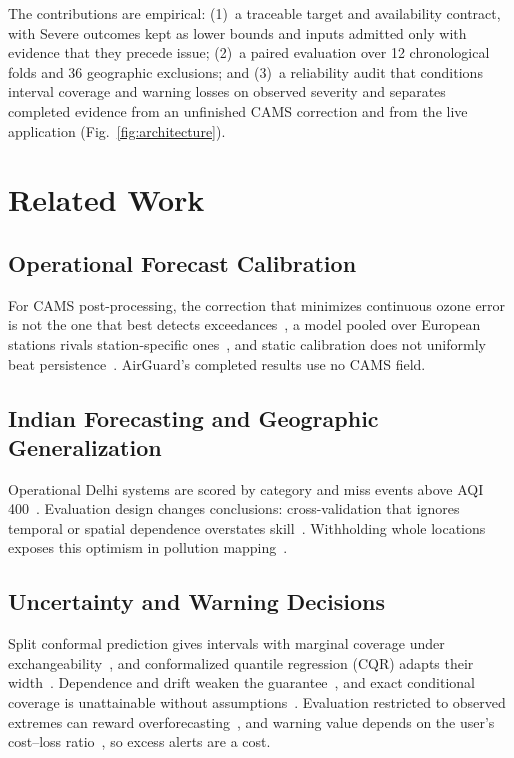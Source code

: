 \documentclass[conference,a4paper]{IEEEtran}
\begin{document}
The contributions are empirical: (1)~a traceable target and availability contract, with Severe outcomes kept as lower bounds and inputs admitted only with evidence that they precede issue; (2)~a paired evaluation over 12 chronological folds and 36 geographic exclusions; and (3)~a reliability audit that conditions interval coverage and warning losses on observed severity and separates completed evidence from an unfinished CAMS correction and from the live application (Fig.~\ref{fig:architecture}).

\section{Related Work}
\subsection{Operational Forecast Calibration}
For CAMS post-processing, the correction that minimizes continuous ozone error is not the one that best detects exceedances~\cite{petetin2022}, a model pooled over European stations rivals station-specific ones~\cite{bertrand2023}, and static calibration does not uniformly beat persistence~\cite{casciaro2022}. AirGuard's completed results use no CAMS field.

\subsection{Indian Forecasting and Geographic Generalization}
Operational Delhi systems are scored by category and miss events above AQI 400~\cite{jena2021,govardhan2024}. Evaluation design changes conclusions: cross-validation that ignores temporal or spatial dependence overstates skill~\cite{roberts2017}. Withholding whole locations exposes this optimism in pollution mapping~\cite{just2020}.

\subsection{Uncertainty and Warning Decisions}
Split conformal prediction gives intervals with marginal coverage under exchangeability~\cite{lei2018}, and conformalized quantile regression (CQR) adapts their width~\cite{romano2019}. Dependence and drift weaken the guarantee~\cite{barber2023}, and exact conditional coverage is unattainable without assumptions~\cite{foygelbarber2021}. Evaluation restricted to observed extremes can reward overforecasting~\cite{lerch2017}, and warning value depends on the user's cost--loss ratio~\cite{murphy1977}, so excess alerts are a cost.
\end{document}
